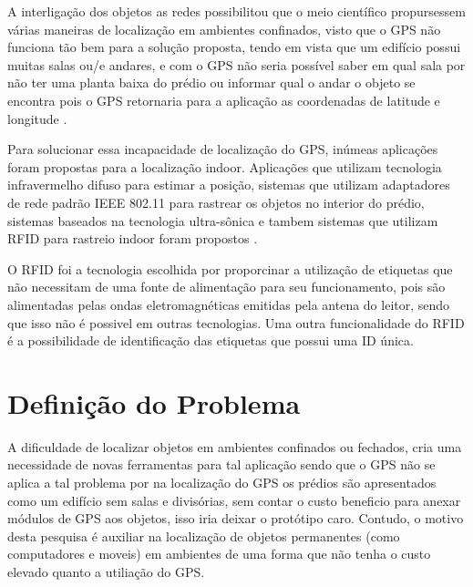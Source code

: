 A interligação dos objetos as redes possibilitou que o meio científico propursessem várias maneiras de localização em ambientes 
confinados, visto que o GPS não funciona tão bem para a solução proposta, tendo em vista que um edifício possui 
muitas salas ou/e andares, e com o GPS não seria possível saber em qual sala por não ter uma planta baixa do prédio ou 
informar qual o andar o objeto se encontra pois o GPS retornaria para a aplicação as coordenadas de latitude e longitude \cite{rfid2009review}.


Para solucionar essa incapacidade de localização do GPS, inúmeas aplicações foram propostas para a localização indoor. 
Aplicações que utilizam tecnologia infravermelho difuso para estimar a posição, sistemas que utilizam adaptadores de rede 
padrão IEEE 802.11 para rastrear os objetos no interior do prédio, sistemas baseados na tecnologia ultra-sônica e 
tambem sistemas que utilizam RFID para rastreio indoor foram propostos \cite{mechanismRFID2006}. 


O RFID foi a tecnologia escolhida por proporcinar a utilização de etiquetas que não necessitam de uma fonte de alimentação 
para seu funcionamento, pois são alimentadas pelas ondas eletromagnéticas emitidas pela antena do leitor, sendo que isso não 
é possivel em outras tecnologias. Uma outra funcionalidade do RFID é a possibilidade de identificação das etiquetas que possui 
uma ID única.



\section{Definição do Problema}
A dificuldade de localizar objetos em ambientes confinados ou fechados, cria uma necessidade de novas ferramentas para 
tal aplicação sendo que o GPS não se aplica a tal problema por na localização do GPS os prédios são apresentados como um edifício sem salas e divisórias, sem contar o custo beneficio para anexar módulos de GPS aos objetos, isso iria deixar o protótipo caro. Contudo, o motivo desta pesquisa é auxiliar na localização de objetos permanentes (como computadores e moveis) 
em ambientes de uma forma que não tenha o custo elevado quanto a utiliação do 
GPS\cite{mechanismRFID2006}.

